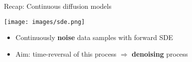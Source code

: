 \begin{frame}{Recap: Continuous diffusion models}
 \begin{center}
        \texttt{[image: images/sde.png]}
    \end{center}
\begin{itemize} [triangle]
    \item Continuously \textbf{noise} data samples with forward SDE
    \item Aim: time-reversal of this process $\Rightarrow$ \textbf{denoising} process
\end{itemize}
%
\end{frame}





